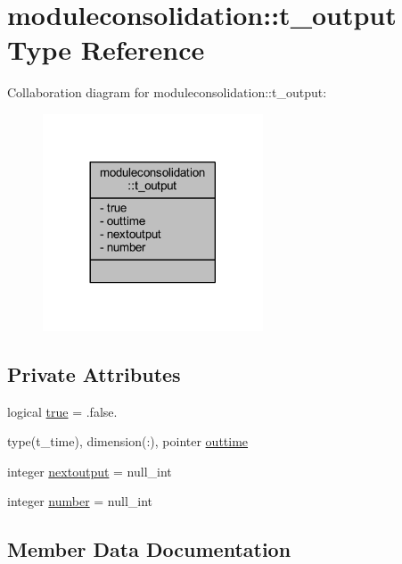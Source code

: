 \hypertarget{structmoduleconsolidation_1_1t__output}{}\section{moduleconsolidation\+:\+:t\+\_\+output Type Reference}
\label{structmoduleconsolidation_1_1t__output}


Collaboration diagram for moduleconsolidation\+:\+:t\+\_\+output\+:\nopagebreak
\begin{figure}[H]
\begin{center}
\leavevmode
\includegraphics[width=185pt]{structmoduleconsolidation_1_1t__output__coll__graph}
\end{center}
\end{figure}
\subsection*{Private Attributes}
\begin{DoxyCompactItemize}
\item 
logical \mbox{\hyperlink{structmoduleconsolidation_1_1t__output_a8ae2e5eb2b2cfb629dcfb223669efe60}{true}} = .false.
\item 
type(t\+\_\+time), dimension(\+:), pointer \mbox{\hyperlink{structmoduleconsolidation_1_1t__output_a6b6f93ca807359dc14c3b26dd7c9ebbc}{outtime}}
\item 
integer \mbox{\hyperlink{structmoduleconsolidation_1_1t__output_a8cf857cc5d73584147d959da1f0dc3ff}{nextoutput}} = null\+\_\+int
\item 
integer \mbox{\hyperlink{structmoduleconsolidation_1_1t__output_a8086c8e157c49c26a0b835028dd18389}{number}} = null\+\_\+int
\end{DoxyCompactItemize}


\subsection{Member Data Documentation}
\mbox{\label{structmoduleconsolidation_1_1t__output_a8cf857cc5d73584147d959da1f0dc3ff}} 
